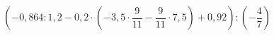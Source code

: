 \begin{ex}[type=calculate]
	\begin{condition}
		\( \left( -0,864:1,2-0,2\cdot\left( -3,5\cdot\dfrac{9}{11}-\dfrac{9}{11}\cdot7,5 \right)+0,92 \right):\left( -\dfrac{4}{7} \right) \)
	\end{condition}
	\answer{}
\end{ex}